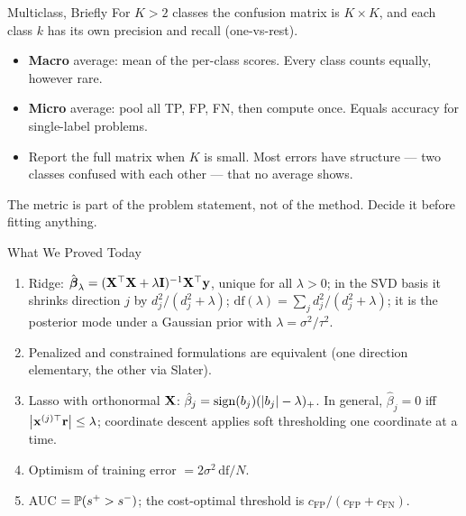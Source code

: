 \documentclass[11pt,aspectratio=169]{beamer}
\begin{document}
\begin{frame}{Multiclass, Briefly}
For $K>2$ classes the confusion matrix is $K\times K$, and each class $k$ has its own precision and recall
(one-vs-rest).
\begin{itemize}
  \item \textbf{Macro} average: mean of the per-class scores. Every class counts equally, however rare.
  \item \textbf{Micro} average: pool all TP, FP, FN, then compute once. Equals accuracy for single-label problems.
  \item Report the full matrix when $K$ is small. Most errors have structure --- two classes confused with each
        other --- that no average shows.
\end{itemize}
\vspace{6pt}
\begin{keypoint}
The metric is part of the problem statement, not of the method. Decide it before fitting anything.
\end{keypoint}
\end{frame}


\begin{frame}{What We Proved Today}
\begin{enumerate}
  \item Ridge: $\hat{\boldsymbol{\beta}}_\lambda=(\mathbf{X}^{\top}\mathbf{X}+\lambda\mathbf{I})^{-1}\mathbf{X}^{\top}\mathbf{y}$, unique for all $\lambda>0$; in the SVD basis it
        shrinks direction $j$ by $d_j^2/(d_j^2+\lambda)$; $\mathrm{df}(\lambda)=\sum_jd_j^2/(d_j^2+\lambda)$; it is the
        posterior mode under a Gaussian prior with $\lambda=\sigma^2/\tau^2$.
  \item Penalized and constrained formulations are equivalent (one direction elementary, the other via Slater).
  \item Lasso with orthonormal $\mathbf{X}$: $\hat\beta_j=\operatorname{sign}(b_j)(\left\lvert b_j \right\rvert-\lambda)_+$. In general, $\hat\beta_j=0$ iff
        $\left\lvert \mathbf{x}^{(j)\top}\mathbf{r} \right\rvert\le\lambda$; coordinate descent applies soft thresholding one coordinate at a time.
  \item Optimism of training error $=2\sigma^2\,\mathrm{df}/N$.
  \item AUC $=\mathbb{P}(s^+>s^-)$; the cost-optimal threshold is $c_{\text{FP}}/(c_{\text{FP}}+c_{\text{FN}})$.
\end{enumerate}
\end{frame}
\end{document}

